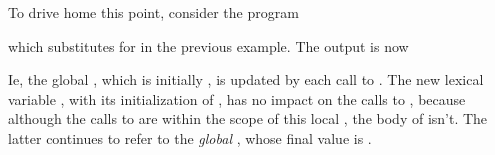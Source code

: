 To drive home this point, consider the program


\n which substitutes  for  in
the previous example.  The output is now


\n Ie, the global , which is initially
, is updated by each call to .
The new lexical variable , with its
initialization of , has no impact on the calls to
, because although the calls to
 are within the scope of this local
, the body of  isn't.  The
latter continues to refer to the {\em global}
, whose final value is .

